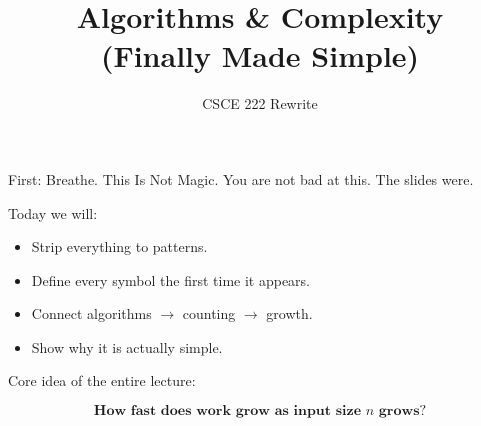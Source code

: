 \documentclass[aspectratio=169]{beamer}
\title{Algorithms \& Complexity \\ (Finally Made Simple)}
\author{CSCE 222 Rewrite}
\date{}
\begin{document}
\begin{frame}
\titlepage
\end{frame}

\begin{frame}{First: Breathe. This Is Not Magic.}
You are not bad at this. The slides were.

\bigskip

Today we will:
\begin{itemize}
\item Strip everything to patterns.
\item Define every symbol the first time it appears.
\item Connect algorithms $\rightarrow$ counting $\rightarrow$ growth.
\item Show why it is actually simple.
\end{itemize}

\bigskip

Core idea of the entire lecture:

\[
\textbf{How fast does work grow as input size } n \textbf{ grows?}
\]
\end{frame}
\end{document}
